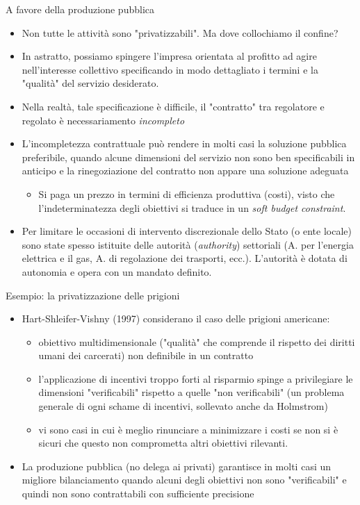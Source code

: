 \documentclass[aspectratio=64,11pt]{beamer}
\begin{document}
\begin{frame}{A favore della produzione pubblica}
\begin{itemize}
\item Non tutte le attività sono "privatizzabili". Ma dove collochiamo il confine?
\item In astratto, possiamo spingere l'impresa orientata al profitto ad agire
nell'interesse collettivo specificando in modo dettagliato i termini e la
"qualità" del servizio desiderato.
\item Nella realtà, tale specificazione è difficile, il "contratto" tra regolatore
e regolato è necessariamento \emph{incompleto}
\item L'\alert{incompletezza contrattuale} può rendere in molti casi la soluzione
pubblica preferibile, quando alcune dimensioni del servizio non sono ben
specificabili in anticipo e la rinegoziazione del contratto non appare una
soluzione adeguata
\begin{itemize}
\item Si paga un prezzo in termini di efficienza produttiva (costi), visto che
l'indeterminatezza degli obiettivi si traduce in un \emph{soft budget
constraint}.
\end{itemize}
\item Per limitare le occasioni di intervento discrezionale dello Stato (o ente
locale) sono state spesso istituite delle autorità (\emph{authority}) settoriali (A. per
l'energia elettrica e il gas, A. di regolazione dei trasporti,
ecc.). L'autorità è dotata di autonomia e opera con un mandato definito.
\end{itemize}
\end{frame}

\begin{frame}{Esempio: la privatizzazione delle prigioni}
\begin{itemize}
\item Hart-Shleifer-Vishny (1997) considerano il caso delle prigioni americane:
\begin{itemize}
\item obiettivo multidimensionale ("qualità" che comprende il rispetto dei
diritti umani dei carcerati) non definibile in un contratto
\item l'applicazione di incentivi troppo forti al risparmio spinge a
privilegiare le dimensioni "verificabili" rispetto a quelle "non
verificabili" (un problema generale di ogni schame di incentivi, sollevato
anche da Holmstrom)
\item vi sono casi in cui è meglio rinunciare a minimizzare i costi se non si è
sicuri che questo non comprometta altri obiettivi rilevanti.
\end{itemize}
\item La produzione pubblica (no delega ai privati) garantisce in molti casi un
migliore bilanciamento quando alcuni degli obiettivi non sono "verificabili"
e quindi non sono contrattabili con sufficiente precisione
\end{itemize}
\end{frame}
\end{document}
